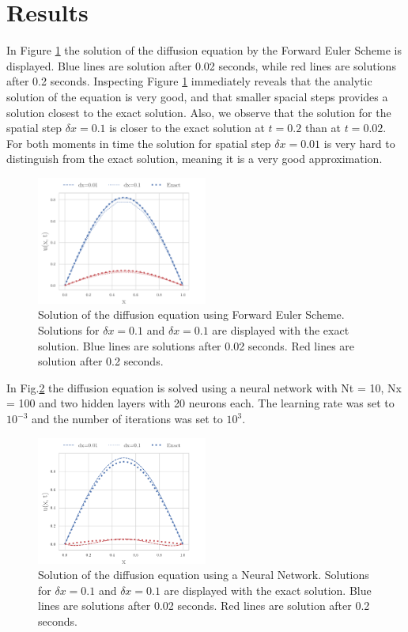 \documentclass[a4paper,11pt,twocolumn]{article}
\begin{document}
\section{Results}

In Figure \ref{euler} the solution of the diffusion equation by the Forward Euler Scheme is displayed. Blue lines are solution after 0.02 seconds, while red lines are solutions after 0.2 seconds. Inspecting Figure \ref{euler} immediately reveals that the analytic solution of the equation is very good, and that smaller spacial steps provides a solution closest to the exact solution. Also, we observe that the solution for the spatial step $\delta x = 0.1$ is closer to the exact solution at $t = 0.2$ than at $t = 0.02$. For both moments in time the solution for spatial step $\delta x = 0.01$ is very hard to distinguish from the exact solution, meaning it is a very good approximation. 


\begin{figure}[h]
	\centering 
	\includegraphics[width=0.5\textwidth]{figures/euler}
	\caption{Solution of the diffusion equation using Forward Euler Scheme. Solutions for $\delta x = 0.1$ and $\delta x = 0.1$ are displayed with the exact solution. Blue lines are solutions after 0.02 seconds. Red lines are solution after 0.2 seconds.}
	\label{euler}
\end{figure}

In Fig.\ref{fig:nn} the diffusion equation is solved using a neural network with Nt = 10, Nx = 100 and two hidden layers with 20 neurons each. The learning rate was set to $10^{-3}$ and the number of iterations was set to $10^3$. 

\begin{figure}[h]
	\centering 
	\includegraphics[width=0.5\textwidth]{figures/NN}
	\caption{Solution of the diffusion equation using a Neural Network. Solutions for $\delta x = 0.1$ and $\delta x = 0.1$ are displayed with the exact solution. Blue lines are solutions after 0.02 seconds. Red lines are solution after 0.2 seconds.}
	\label{fig:nn}
\end{figure}
\end{document}

